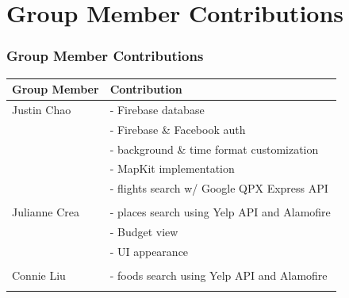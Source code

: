 \documentclass{beamer}
\begin{document}
\section{Group Member Contributions}
\begin{frame}
\frametitle{Group Member Contributions}
    \begin{tabular}{l|l}
        Group Member & Contribution \\
        \hline
        Justin Chao & - Firebase database \\
         & - Firebase \& Facebook auth \\
         & - background \& time format customization \\
         & - MapKit implementation \\
         & - flights search w/ Google QPX Express API \\
         &  \\

        Julianne Crea & - places search using Yelp API and Alamofire \\ 
         & - Budget view \\
         & - UI appearance \\
         &  \\
         
        Connie Liu & - foods search using Yelp API and Alamofire \\
         &  \\
    \end{tabular}
\end{frame}
\end{document}

